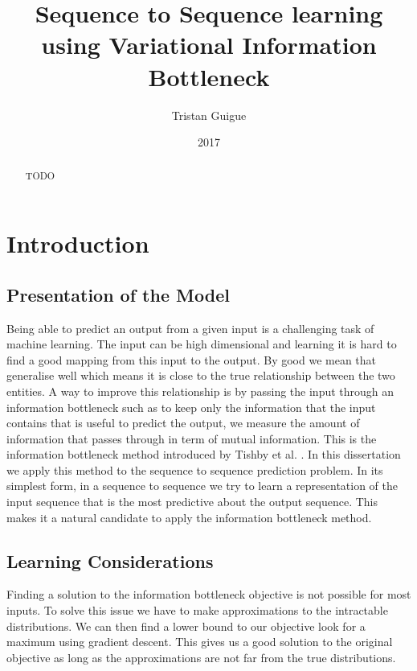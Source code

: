 \documentclass[10pt,oneside,openright]{report}
\title{Sequence to Sequence learning using Variational Information Bottleneck}
\author{Tristan Guigue}
\date{2017}
\begin{document}
\maketitle

\declaration

\begin{abstract}
TODO
\end{abstract}

\tableofcontents

\chapter{Introduction}
\section{Presentation of the Model}
Being able to predict an output from a given input is a challenging task of machine learning. The input can be high dimensional and learning it is hard to find a good mapping from this input to the output. By good we mean that generalise well which means it is close to the true relationship between the two entities. A way to improve this relationship is by passing the input through an information bottleneck such as to keep only the information that the input contains that is useful to predict the output, we measure the amount of information that passes through in term of mutual information. This is the information bottleneck method introduced by Tishby et al. \cite{tishby}. In this dissertation we apply this method to the sequence to sequence prediction problem. In its simplest form, in a sequence to sequence we try to learn a representation of the input sequence that is the most predictive about the output sequence. This makes it a natural candidate to apply the information bottleneck method. 

\section{Learning Considerations}
Finding a solution to the information bottleneck objective is not possible for most inputs. To solve this issue we have to make approximations to the intractable distributions. We can then find a lower bound to our objective look for a maximum using gradient descent. This gives us a good solution to the original objective as long as the approximations are not far from the true distributions.
\end{document}
